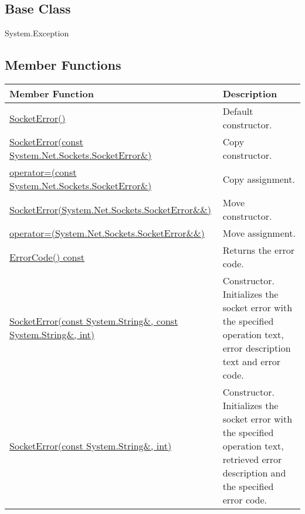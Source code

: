 \documentclass[a4paper,oneside,11.000000pt]{book}
\begin{document}
\subsection*{Base Class}
System.Exception\subsection{Member Functions}
\begin{flushleft}
\begin{supertabular}[l]{!{\raggedright}p{7.575cm}!{\raggedright}p{7.575cm}}
\textbf{Member Function}
& \textbf{Description}
\\
\hline
\hyperlink{System.Net.Sockets.SocketError.constructor.P.System.Net.Sockets.SocketError}{SocketError()}
& Default constructor.

\\
\hyperlink{System.Net.Sockets.SocketError.constructor.P.System.Net.Sockets.SocketError.C.R.System.Net.Sockets.SocketError}{SocketError(const System.\-Net.\-Sockets.\-SocketError\&\-)}
& Copy constructor.

\\
\hyperlink{System.Net.Sockets.SocketError.operator.assign.P.System.Net.Sockets.SocketError.C.R.System.Net.Sockets.SocketError}{operator=(const System.\-Net.\-Sockets.\-SocketError\&\-)}
& Copy assignment.

\\
\hyperlink{System.Net.Sockets.SocketError.constructor.P.System.Net.Sockets.SocketError.RR.System.Net.Sockets.SocketError}{SocketError(System.\-Net.\-Sockets.\-SocketError\&\-\&\-)}
& Move constructor.

\\
\hyperlink{System.Net.Sockets.SocketError.operator.assign.P.System.Net.Sockets.SocketError.RR.System.Net.Sockets.SocketError}{operator=(System.\-Net.\-Sockets.\-SocketError\&\-\&\-)}
& Move assignment.

\\
\hyperlink{System.Net.Sockets.SocketError.ErrorCode.C.P.System.Net.Sockets.SocketError}{ErrorCode() const}
& Returns the error code.

\\
\hyperlink{System.Net.Sockets.SocketError.constructor.P.System.Net.Sockets.SocketError.C.R.System.String.C.R.System.String.int}{SocketError(const System.\-String\&\-, const System.\-String\&\-, int)}
& Constructor. Initializes the socket error with the specified operation text, error description text and error code.

\\
\hyperlink{System.Net.Sockets.SocketError.constructor.P.System.Net.Sockets.SocketError.C.R.System.String.int}{SocketError(const System.\-String\&\-, int)}
& Constructor. Initializes the socket error with the specified operation text, retrieved error description and the specified error code.

\\
\end{supertabular}

\end{flushleft}
\clearpage
\end{document}
